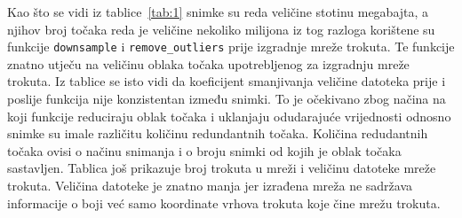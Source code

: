 Kao što se vidi iz tablice~\ref{tab:1} snimke su reda veličine stotinu
megabajta, a njihov broj točaka reda je veličine nekoliko milijona iz
tog razloga korištene su funkcije \texttt{downsample} i
\texttt{remove\_outliers} prije izgradnje mreže trokuta. Te funkcije
znatno utječu na veličinu oblaka točaka upotrebljenog za izgradnju mreže
trokuta. Iz tablice se isto vidi da koeficijent smanjivanja veličine
datoteka prije i poslije funkcija nije konzistentan između snimki. To je
očekivano zbog načina na koji funkcije reduciraju oblak točaka i
uklanjaju odudarajuće vrijednosti odnosno snimke su imale različitu
količinu redundantnih točaka. Količina redudantnih točaka ovisi o načinu
snimanja i o broju snimki od kojih je oblak točaka sastavljen.  Tablica
još prikazuje broj trokuta u mreži i veličinu datoteke mreže trokuta.
Veličina datoteke je znatno manja jer izrađena mreža ne sadržava
informacije o boji već samo koordinate vrhova trokuta koje čine mrežu
trokuta.




